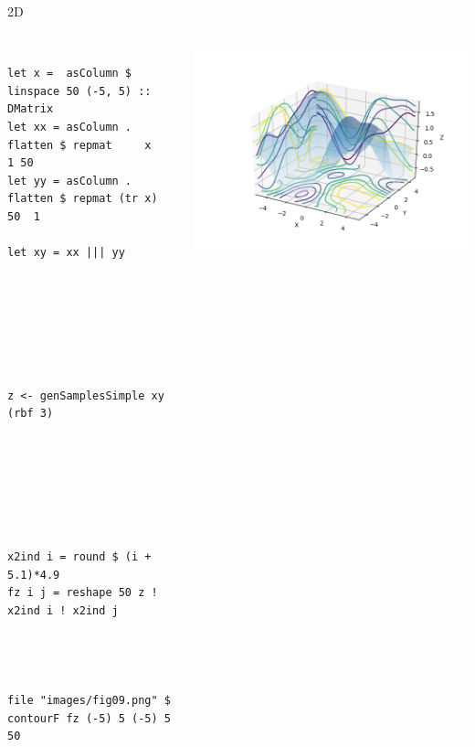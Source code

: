 \documentclass[presentation]{beamer}
\begin{document}
\begin{frame}[fragile,label={sec:orgb5f35fa}]{2D}
 \begin{columns}
\begin{column}{0.35\columnwidth}
\begin{verbatim}

let x =  asColumn $ linspace 50 (-5, 5) :: DMatrix
let xx = asColumn . flatten $ repmat     x   1 50
let yy = asColumn . flatten $ repmat (tr x) 50  1

let xy = xx ||| yy







z <- genSamplesSimple xy (rbf 3)







x2ind i = round $ (i + 5.1)*4.9
fz i j = reshape 50 z ! x2ind i ! x2ind j




file "images/fig09.png" $ contourF fz (-5) 5 (-5) 5 50

\end{verbatim}
\end{column}



\begin{column}{0.65\columnwidth}
\begin{center}
\includegraphics[width=.9\linewidth]{images/fig09.png}
\end{center}
\end{column}
\end{columns}
\end{frame}
\end{document}
